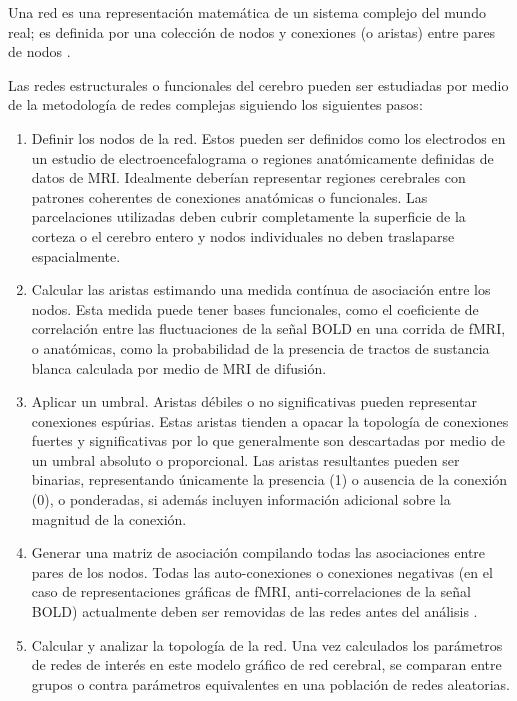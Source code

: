 Una red es una representación matemática de un sistema complejo del mundo real; es definida por una colección de nodos y conexiones (o aristas) entre pares de nodos \parencite{Bullmore2009a,Rubinov2010}. \par
Las redes estructurales o funcionales del cerebro pueden ser estudiadas por medio de la metodología de redes complejas siguiendo los siguientes pasos:
\begin{enumerate}
    \item Definir los nodos de la red.
        Estos pueden ser definidos como los electrodos en un estudio de electroencefalograma o regiones anatómicamente definidas de datos de MRI.
        Idealmente deberían representar regiones cerebrales con patrones coherentes de conexiones anatómicas o funcionales.
        Las parcelaciones utilizadas deben cubrir completamente la superficie de la corteza o el cerebro entero y nodos individuales no deben traslaparse espacialmente.
    \item Calcular las aristas estimando una medida contínua de asociación entre los nodos.
        Esta medida puede tener bases funcionales, como el coeficiente de correlación entre las fluctuaciones de la señal BOLD en una corrida de fMRI, o anatómicas, como la probabilidad de la presencia de tractos de sustancia blanca calculada por medio de MRI de difusión.
    \item Aplicar un umbral.
        Aristas débiles o no significativas pueden representar conexiones espúrias.
        Estas aristas tienden a opacar la topología de conexiones fuertes y significativas por lo que generalmente son descartadas por medio de un umbral absoluto o proporcional.
        Las aristas resultantes pueden ser binarias, representando únicamente la presencia (1) o ausencia de la conexión (0), o ponderadas, si además incluyen información adicional sobre la magnitud de la conexión.
    \item Generar una matriz de asociación compilando todas las asociaciones entre pares de los nodos.
        Todas las auto-conexiones o conexiones negativas (en el caso de representaciones gráficas de fMRI, anti-correlaciones de la señal BOLD) actualmente deben ser removidas de las redes antes del análisis \parencite{Rubinov2010}.
    \item Calcular y analizar la topología de la red.
        Una vez calculados los parámetros de redes de interés en este modelo gráfico de red cerebral, se comparan entre grupos o contra parámetros equivalentes en una población de redes aleatorias.
\end{enumerate}

